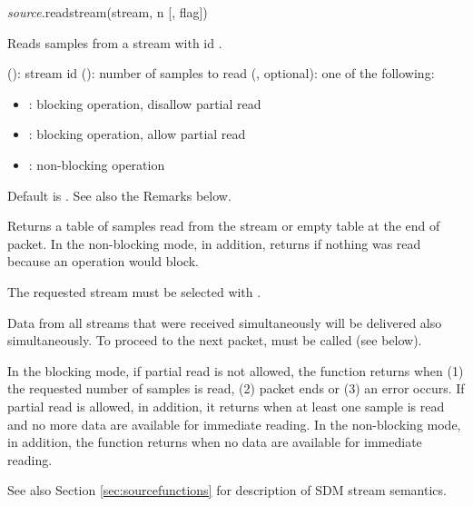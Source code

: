 \documentclass[a4paper,12pt,twoside,extrafontsizes]{memoir}
\begin{document}
\begin{luafuncprototype}
\emph{source}.readstream(stream, n [, flag])
\end{luafuncprototype}

\begin{funcdescr}
	Reads  samples from a stream with id .
\end{funcdescr}

\begin{funcparams}
	 (): stream id
	 (): number of samples to read
	 (, optional): one of the following:
		\begin{itemize}
			\item {}: blocking operation, disallow partial read
			\item {}: blocking operation, allow partial read
			\item {}: non-blocking operation
		\end{itemize}
		
		Default is . See also the Remarks below.
\end{funcparams}

\begin{funcret}
	Returns a table of samples read from the stream or empty table at the end of packet. In the non-blocking mode, in addition, returns  if nothing was read because an operation would block.
\end{funcret}

\begin{funcremarks}
	The requested stream must be selected with .
	
	Data from all streams that were received simultaneously will be delivered also simultaneously. To proceed to the next packet,  must be called (see below).
	
	In the blocking mode, if partial read is not allowed, the function returns when (1) the requested number of samples is read, (2) packet ends or (3) an error occurs. If partial read is allowed, in addition, it returns when at least one sample is read and no more data are available for immediate reading. In the non-blocking mode, in addition, the function returns when no data are available for immediate reading.
	
	See also Section \ref{sec:sourcefunctions} for description of SDM stream semantics.
\end{funcremarks}
\end{document}
